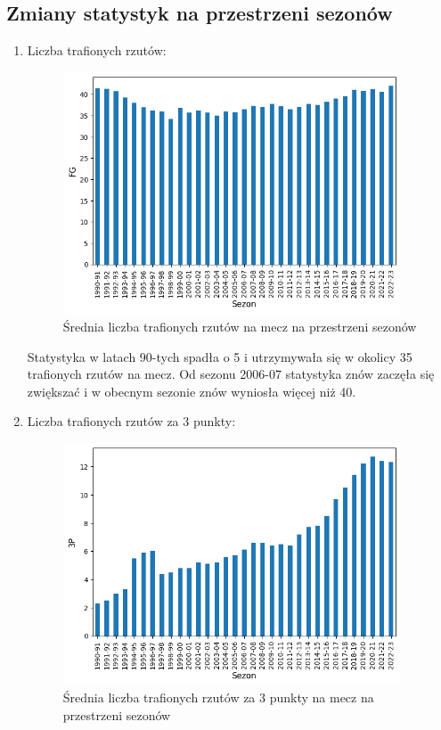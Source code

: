 \documentclass{article}
\begin{document}
    \subsection{Zmiany statystyk na przestrzeni sezonów}
    
    \begin{enumerate}
        \item Liczba trafionych rzutów:
            \begin{figure}[H]
                \centering
                \includegraphics[width=10cm]{wykres_FG.png}
                \caption{Średnia liczba trafionych rzutów na mecz na przestrzeni sezonów}
                \label{fig:wykres_FG}
            \end{figure}

        Statystyka w latach 90-tych spadła o 5 i utrzymywała się w okolicy 35 trafionych rzutów na mecz. Od sezonu 2006-07 statystyka znów zaczęła się zwiększać i w obecnym sezonie znów wyniosła więcej niż 40.

  \newpage
        \item Liczba trafionych rzutów za 3 punkty:
            \begin{figure}[H]
                \centering
                \includegraphics[width=10cm]{wykres_3P.png}
                \caption{Średnia liczba trafionych rzutów za 3 punkty na mecz na przestrzeni sezonów}
                \label{fig:wykres_3P}
            \end{figure}


\end{enumerate}
\end{document}
